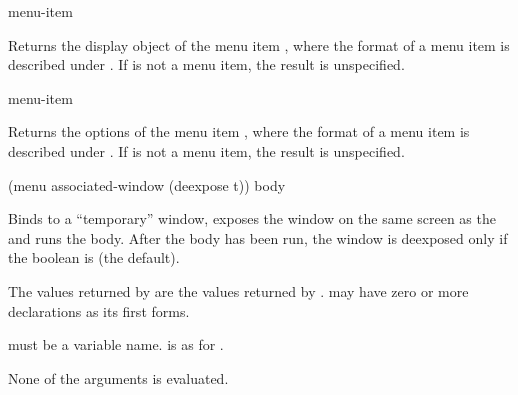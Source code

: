  {menu-item}

Returns the display object of the menu item , where the format of
a menu item is described under .  If  is not a
menu item, the result is unspecified.

 {menu-item}

Returns the options of the menu item , where the format of a menu
item is described under .  If  is not a menu
item, the result is unspecified.


 {(menu \optional associated-window \key (deexpose t))
                       \body body} 

Binds  to a ``temporary'' window, exposes the window on the same
screen as the  and runs the body.  After the body has
been run, the window is deexposed only if the boolean  is
 (the default).

The values returned by  are the values returned by .
 may have zero or more declarations as its first forms.

 must be a variable name.   is as for
.

None of the arguments is evaluated.
